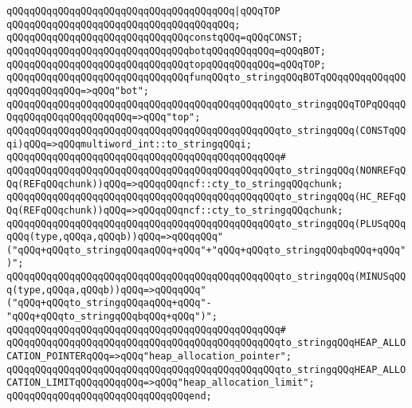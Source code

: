 \verb|qQQqqQQqqQQqqQQqqQQqqQQqqQQqqQQqqQQqqQQq|\verb#|qQQqTOP#\newline
\verb|qQQqqQQqqQQqqQQqqQQqqQQqqQQqqQQqqQQqqQQq;|\newline
\newline
\verb|qQQqqQQqqQQqqQQqqQQqqQQqqQQqqQQqconstqQQq=qQQqCONST;|\newline
\verb|qQQqqQQqqQQqqQQqqQQqqQQqqQQqqQQqbotqQQqqQQqqQQq=qQQqBOT;|\newline
\verb|qQQqqQQqqQQqqQQqqQQqqQQqqQQqqQQqtopqQQqqQQqqQQq=qQQqTOP;|\newline
\newline
\verb|qQQqqQQqqQQqqQQqqQQqqQQqqQQqqQQqfunqQQqto_stringqQQqBOTqQQqqQQqqQQqqQQqqQQqqQQqqQQq=>qQQq"bot";|\newline
\verb|qQQqqQQqqQQqqQQqqQQqqQQqqQQqqQQqqQQqqQQqqQQqqQQqto_stringqQQqTOPqQQqqQQqqQQqqQQqqQQqqQQqqQQq=>qQQq"top";|\newline
\verb|qQQqqQQqqQQqqQQqqQQqqQQqqQQqqQQqqQQqqQQqqQQqqQQqto_stringqQQq(CONSTqQQqi)qQQq=>qQQqmultiword_int::to_stringqQQqi;|\newline
\verb|qQQqqQQqqQQqqQQqqQQqqQQqqQQqqQQqqQQqqQQqqQQqqQQq#|\newline
\verb|qQQqqQQqqQQqqQQqqQQqqQQqqQQqqQQqqQQqqQQqqQQqqQQqto_stringqQQq(NONREFqQQq(REFqQQqchunk))qQQq=>qQQqqQQqncf::cty_to_stringqQQqchunk;|\newline
\verb|qQQqqQQqqQQqqQQqqQQqqQQqqQQqqQQqqQQqqQQqqQQqqQQqto_stringqQQq(HC_REFqQQq(REFqQQqchunk))qQQq=>qQQqqQQqncf::cty_to_stringqQQqchunk;|\newline
\verb|qQQqqQQqqQQqqQQqqQQqqQQqqQQqqQQqqQQqqQQqqQQqqQQqto_stringqQQq(PLUSqQQqqQQq(type,qQQqa,qQQqb))qQQq=>qQQqqQQq"("qQQq+qQQqto_stringqQQqaqQQq+qQQq"+"qQQq+qQQqto_stringqQQqbqQQq+qQQq")";|\newline
\verb|qQQqqQQqqQQqqQQqqQQqqQQqqQQqqQQqqQQqqQQqqQQqqQQqto_stringqQQq(MINUSqQQq(type,qQQqa,qQQqb))qQQq=>qQQqqQQq"("qQQq+qQQqto_stringqQQqaqQQq+qQQq"-"qQQq+qQQqto_stringqQQqbqQQq+qQQq")";|\newline
\verb|qQQqqQQqqQQqqQQqqQQqqQQqqQQqqQQqqQQqqQQqqQQqqQQq#|\newline
\verb|qQQqqQQqqQQqqQQqqQQqqQQqqQQqqQQqqQQqqQQqqQQqqQQqto_stringqQQqHEAP_ALLOCATION_POINTERqQQq=>qQQq"heap_allocation_pointer";|\newline
\verb|qQQqqQQqqQQqqQQqqQQqqQQqqQQqqQQqqQQqqQQqqQQqqQQqto_stringqQQqHEAP_ALLOCATION_LIMITqQQqqQQqqQQq=>qQQq"heap_allocation_limit";|\newline
\verb|qQQqqQQqqQQqqQQqqQQqqQQqqQQqqQQqend;|\newline
